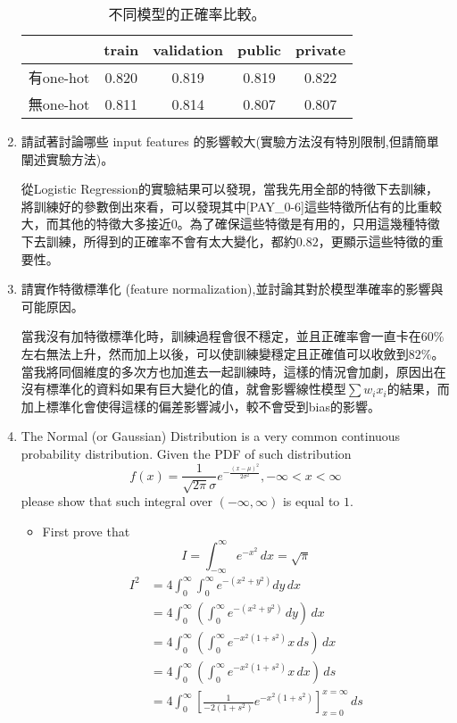 \documentclass[12pt, a4paper]{article}
\begin{document}
\begin{enumerate}
\begin{table}[ht]
\begin{tabular}{|l|c|c|c|c|}
        &train&validation&public&private\\\hline
        有one-hot&0.820&0.819&0.819&0.822\\\hline
        無one-hot&0.811&0.814&0.807&0.807\\\hline
    \end{tabular}
    \caption{不同模型的正確率比較。}
    \label{tab:one_hot}
\end{table}
\item 請試著討論哪些 input features 的影響較大(實驗方法沒有特別限制,但請簡單闡述實驗方法)。\par
從Logistic Regression的實驗結果可以發現，當我先用全部的特徵下去訓練，將訓練好的參數倒出來看，可以發現其中[PAY\_0-6]這些特徵所佔有的比重較大，而其他的特徵大多接近$0$。為了確保這些特徵是有用的，只用這幾種特徵下去訓練，所得到的正確率不會有太大變化，都約$0.82$，更顯示這些特徵的重要性。
\item 請實作特徵標準化 (feature normalization),並討論其對於模型準確率的影響與可能原因。\par
當我沒有加特徵標準化時，訓練過程會很不穩定，並且正確率會一直卡在$60\%$左右無法上升，然而加上以後，可以使訓練變穩定且正確值可以收斂到$82\%$。當我將同個維度的多次方也加進去一起訓練時，這樣的情況會加劇，原因出在沒有標準化的資料如果有巨大變化的值，就會影響線性模型$\sum w_ix_i$的結果，而加上標準化會使得這樣的偏差影響減小，較不會受到bias的影響。
\item The Normal (or Gaussian) Distribution is a very common continuous
probability distribution. Given the PDF of such distribution
$$f(x) = \frac{1}{\sqrt{2\pi}\sigma}e^{-\frac{(x-\mu)^2}{2\sigma^2}}, -\infty < x < \infty$$
please show that such integral over $(−\infty, \infty)$ is equal to $1$.
\begin{itemize}
    \item First prove that $$I = \int_{-\infty}^{\infty}e^{-x^{2}}\,dx=\sqrt{\pi}$$
    \begin{align*}
        I^{2}&=4\int _{0}^{\infty }\int _{0}^{\infty }e^{-(x^{2}+y^{2})}dy\,dx\\
        &=4\int _{0}^{\infty }\left(\int _{0}^{\infty }e^{-(x^{2}+y^{2})}\,dy\right)\,dx\\
        &=4\int _{0}^{\infty }\left(\int _{0}^{\infty }e^{-x^{2}(1+s^{2})}x\,ds\right)\,dx\\
        &=4\int _{0}^{\infty }\left(\int _{0}^{\infty }e^{-x^{2}(1+s^{2})}x\,dx\right)\,ds\\
        &=4\int _{0}^{\infty }\left[{\frac {1}{-2(1+s^{2})}}e^{-x^{2}(1+s^{2})}\right]_{x=0}^{x=\infty }\,ds\\

\end{align*}
\end{itemize}
\end{enumerate}
\end{document}
